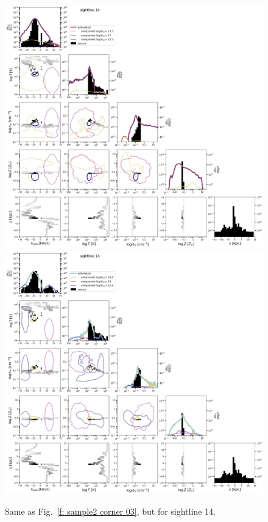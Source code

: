 \documentclass[fleqn,usenatbib]{mnras}
\begin{document}
\begin{figure}
    \centering
    \includegraphics[height=0.45\textheight]{figures/sample2/original/sightline_0014.png}
    \includegraphics[height=0.45\textheight]{figures/sample2/high-z/sightline_0014.png}
    \label{f: sample2 14 corner}
    \caption{Same as Fig.~\ref{f: sample2 corner 03}, but for sightline 14.}
\end{figure}
\end{document}
